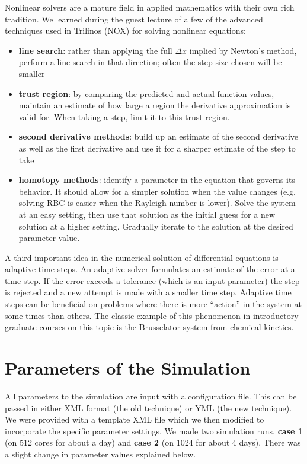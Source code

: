 \documentclass[11pt]{article} %
\begin{document}
Nonlinear solvers are a mature field in applied mathematics with their own rich tradition.
We learned during the guest lecture of a few of the advanced techniques 
used in Trilinos (NOX) for solving nonlinear equations:
\begin{itemize}
\item{\textbf{line search}}: rather than applying the full $\Delta x$ implied by Newton's method,
perform a line search in that direction; often the step size chosen will be smaller
\item{\textbf{trust region}}: by comparing the predicted and actual function values,
maintain an estimate of how large a region the derivative approximation is valid
for.  When taking a step, limit it to this trust region.
\item{\textbf{second derivative methods}}: build up an estimate of the second derivative as well
as the first derivative and use it for a sharper estimate of the step to take
\item{\textbf{homotopy methods}}: identify a parameter in the equation that governs its behavior.
It should allow for a simpler solution when the value changes 
(e.g. solving RBC is easier when the Rayleigh number is lower).
Solve the system at an easy setting, then use that solution as the initial guess
 for a new solution at a higher setting.  Gradually iterate to the solution at
 the desired parameter value.
\end{itemize}

A third important idea in the numerical solution of differential equations is adaptive time steps.
An adaptive solver formulates an estimate of the error at a time step.  
If the error exceeds a tolerance (which is an input parameter) the step is rejected and 
a new attempt is made with a smaller time step.
Adaptive time steps can be beneficial on problems where there is more ``action'' in the
system at some times than others.  
The classic example of this phenomenon in introductory graduate courses on this
topic is the Brusselator system from chemical kinetics.

\section{Parameters of the Simulation}
All parameters to the simulation are input with a configuration file.
This can be passed in either XML format (the old technique) or YML (the new technique).
We were provided with a template XML file which we then modified to incorporate the 
specific parameter settings.
We made two simulation runs, \textbf{case 1} (on 512 cores for about a day)
and \textbf{case 2} (on 1024 for about 4 days).  
There was a slight change in parameter values explained below.
\end{document}
